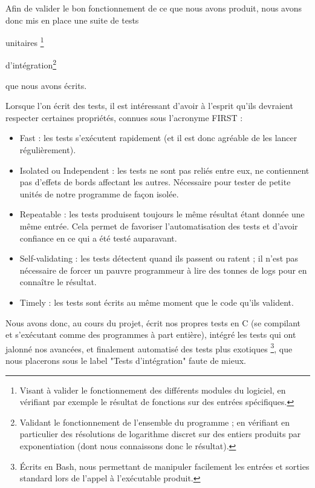       Afin de valider le bon fonctionnement de ce que nous avons produit, nous avons donc mis en place une suite de tests
      \begin{enumerate*}
        \item unitaires \footnote{Visant à valider le fonctionnement des différents modules du logiciel, en vérifiant par exemple le résultat de fonctions sur des entrées spécifiques.}
        \item d'intégration\footnote{Validant le fonctionnement de l'ensemble du programme ; en vérifiant en particulier des résolutions de logarithme discret sur des entiers produits par exponentiation (dont nous connaissons donc le résultat).}
      \end{enumerate*}
      que nous avons écrits.

      Lorsque l'on écrit des tests, il est intéressant d'avoir à l'esprit qu'ils devraient respecter certaines propriétés, connues sous l'acronyme FIRST :
      \begin{itemize}
        \item Fast : les tests s'exécutent rapidement (et il est donc agréable de les lancer régulièrement).
        \item Isolated ou Independent : les tests ne sont pas reliés entre eux, ne contiennent pas d'effets de bords affectant les autres. Nécessaire pour tester de petite unités de notre programme de façon isolée.
        \item Repeatable : les tests produisent toujours le même résultat étant donnée une même entrée. Cela permet de favoriser l'automatisation des tests et d'avoir confiance en ce qui a été testé auparavant.
        \item Self-validating : les tests détectent quand ils passent ou ratent ; il n'est pas nécessaire de forcer un pauvre programmeur à lire des tonnes de logs pour en connaître le résultat.
        \item Timely : les tests sont écrits au même moment que le code qu'ils valident.
      \end{itemize}

      Nous avons donc, au cours du projet, écrit nos propres tests en C (se compilant et s'exécutant comme des programmes à part entière), intégré les tests qui ont jalonné nos avancées, et finalement automatisé des tests plus exotiques \footnote{Écrits en Bash, nous permettant de manipuler facilement les entrées et sorties standard lors de l'appel à l'exécutable produit.}, que nous placerons sous le label "Tests d'intégration" faute de mieux.

